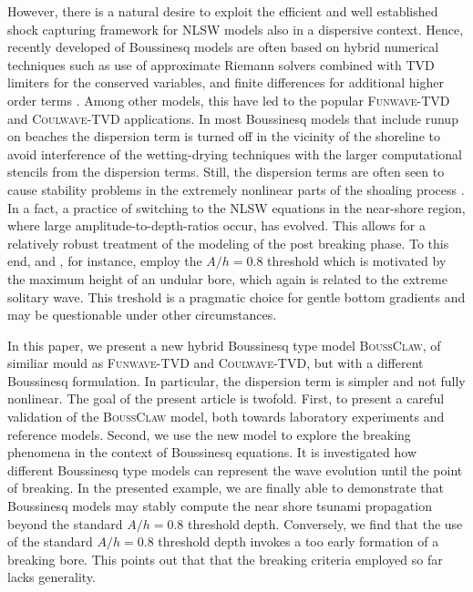 \documentclass[review]{elsarticle}
\newcommand{\BoussClaw}{\textsc{BoussClaw} }
\newcommand{\BoussClawt}{\textsc{BoussClaw}}
\begin{document}
However, there is a natural desire to exploit the efficient and well established shock capturing framework for NLSW models also in a dispersive context.
Hence, recently developed of  Boussinesq models are often based on hybrid numerical techniques
such as use of approximate Riemann solvers combined with TVD limiters for the conserved variables, and finite differences
for additional higher order terms \citep{Erduran2005,Kim2009,Shiach:2009,Roeber:2010,Dutykh:2011,shi2012high}. Among other models, this have led to the popular
\textsc{Funwave-TVD} and \textsc{Coulwave-TVD} applications. 
In most Boussinesq models that include runup on beaches the dispersion term
is turned off in the vicinity of the shoreline to avoid interference of
the wetting-drying techniques with the
larger computational stencils from the dispersion terms. Still,
the dispersion terms are often seen to cause stability problems in
the extremely nonlinear parts of the shoaling process \citep{Lovholt:2013a}.
In a fact, a practice of  
switching to the NLSW equations in the near-shore region, where large amplitude-to-depth-ratios occur, has evolved.
This allows for a relatively robust treatment of the modeling of the post breaking phase. To this end, \cite{tonelli2009hybrid} and \citep{shi2012high}, for instance, employ the $A/h = 0.8$ threshold which is motivated by the maximum 
height of an undular bore, which again is related to the extreme solitary wave.
This treshold is a pragmatic choice for gentle   bottom gradients and
may be questionable under other circumstances.  

In this paper, we present a new hybrid Boussinesq type model \BoussClawt, 
of similiar mould as \textsc{Funwave-TVD} and \textsc{Coulwave-TVD}, but with a different Boussinesq formulation. In particular, the dispersion term is simpler
and not fully nonlinear. The goal of the present article is twofold.
First, to present a careful validation of the \BoussClaw model, both towards  
laboratory experiments and reference models. Second, we use the new model
to explore the breaking phenomena in the context of Boussinesq equations.
It is investigated how different Boussinesq type models 
can represent the wave evolution until the point of breaking. In the presented example,
we are finally able to demonstrate that Boussinesq models may stably
compute the near shore tsunami propagation beyond the standard $A/h = 0.8$ threshold depth.
Conversely, we find that the use of the standard $A/h = 0.8$ threshold depth 
invokes a too early formation of a breaking bore. This points out that  
that the breaking criteria employed so far lacks generality.
\end{document}
